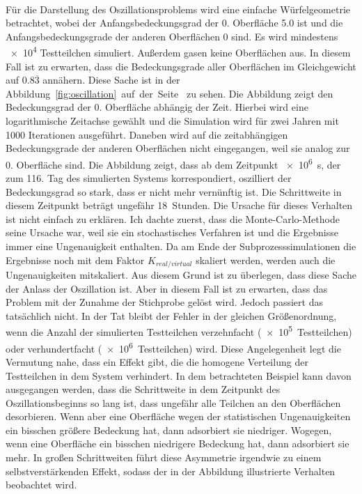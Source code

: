 \documentclass{listhesis}
\begin{document}
\paragraph{}
Für die Darstellung des Oszillationsproblems wird eine einfache Würfelgeometrie betrachtet, wobei der Anfangsbedeckungsgrad der 0. Oberfläche 5.0 ist und die Anfangsbedeckungsgrade der anderen Oberflächen 0 sind. Es wird mindestens \SI{e4}{} Testteilchen simuliert. Außerdem gasen keine Oberflächen aus. In diesem Fall ist zu erwarten, dass die Bedeckungsgrade aller Oberflächen im Gleichgewicht auf $0.8\overline{3}$ annähern. Diese Sache ist in der Abbildung~\ref{fig:oscillation}~auf~der~Seite~\pageref{fig:oscillation} zu sehen. Die Abbildung zeigt den Bedeckungsgrad der 0. Oberfläche abhängig der Zeit. Hierbei wird eine logarithmische Zeitachse gewählt und die Simulation wird für zwei Jahren mit 1000 Iterationen ausgeführt. Daneben wird auf die zeitabhängigen Bedeckungsgrade der anderen Oberflächen nicht eingegangen, weil sie analog zur 0. Oberfläche sind. Die Abbildung zeigt, dass ab dem Zeitpunkt \SI{e6}{\s}, der zum 116. Tag des simulierten Systems korrespondiert, oszilliert der Bedeckungsgrad so stark, dass er nicht mehr vernünftig ist. Die Schrittweite in diesem Zeitpunkt beträgt ungefähr \SI{18}{Stunden}. Die Ursache für dieses Verhalten ist nicht einfach zu erklären. Ich dachte zuerst, dass die Monte-Carlo-Methode seine Ursache war, weil sie ein stochastisches Verfahren ist und die Ergebnisse immer eine Ungenauigkeit enthalten. Da am Ende der Subprozesssimulationen die Ergebnisse noch mit dem Faktor $K_{real/virtual}$ skaliert werden, werden auch die Ungenauigkeiten mitskaliert. Aus diesem Grund ist zu überlegen, dass diese Sache der Anlass der Oszillation ist. Aber in diesem Fall ist zu erwarten, dass das Problem mit der Zunahme der Stichprobe gelöst wird. Jedoch passiert das tatsächlich nicht. In der Tat bleibt der Fehler in der gleichen Größenordnung, wenn die Anzahl der simulierten Testteilchen verzehnfacht (\SI{e5} {Testteilchen}) oder verhundertfacht (\SI{e6}{Testteilchen}) wird. Diese Angelegenheit legt die Vermutung nahe, dass ein Effekt gibt, die die homogene Verteilung der Testteilchen in dem System verhindert. In dem betrachteten Beispiel kann davon ausgegangen werden, dass die Schrittweite in dem Zeitpunkt des Oszillationsbeginns so lang ist, dass ungefähr alle Teilchen an den Oberflächen desorbieren. Wenn aber eine Oberfläche wegen der statistischen Ungenauigkeiten ein bisschen größere Bedeckung hat, dann adsorbiert sie niedriger. Wogegen, wenn eine Oberfläche ein bisschen niedrigere Bedeckung hat, dann adsorbiert sie mehr. In großen Schrittweiten führt diese Asymmetrie irgendwie zu einem selbstverstärkenden Effekt, sodass der in der Abbildung illustrierte Verhalten beobachtet wird.
\end{document}
